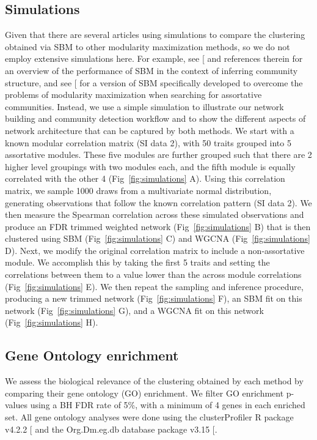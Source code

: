 \documentclass[
]{article}
\begin{document}
\subsection{Simulations}\label{simulations}

Given that there are several articles using simulations to compare the
clustering obtained via SBM to other modularity maximization methods, so
we do not employ extensive simulations here. For example, see
{[}\citeproc{ref-Peixoto2023-xd}{18}{]} and references therein for an
overview of the performance of SBM in the context of inferring community
structure, and see {[}\citeproc{ref-Zhang2020-up}{19}{]} for a version
of SBM specifically developed to overcome the problems of modularity
maximization when searching for assortative communities. Instead, we use
a simple simulation to illustrate our network building and community
detection workflow and to show the different aspects of network
architecture that can be captured by both methods. We start with a known
modular correlation matrix (SI data 2), with 50 traits grouped into 5
assortative modules. These five modules are further grouped such that
there are 2 higher level groupings with two modules each, and the fifth
module is equally correlated with the other 4 (Fig~\ref{fig:simulations}
A). Using this correlation matrix, we sample 1000 draws from a
multivariate normal distribution, generating observations that follow
the known correlation pattern (SI data 2). We then measure the Spearman
correlation across these simulated observations and produce an FDR
trimmed weighted network (Fig~\ref{fig:simulations} B) that is then
clustered using SBM (Fig~\ref{fig:simulations} C) and WGCNA
(Fig~\ref{fig:simulations} D). Next, we modify the original correlation
matrix to include a non-assortative module. We accomplish this by taking
the first 5 traits and setting the correlations between them to a value
lower than the across module correlations (Fig~\ref{fig:simulations} E).
We then repeat the sampling and inference procedure, producing a new
trimmed network (Fig~\ref{fig:simulations} F), an SBM fit on this
network (Fig~\ref{fig:simulations} G), and a WGCNA fit on this network
(Fig~\ref{fig:simulations} H).

\subsection{Gene Ontology enrichment}\label{gene-ontology-enrichment}

We assess the biological relevance of the clustering obtained by each
method by comparing their gene ontology (GO) enrichment. We filter GO
enrichment p-values using a BH FDR rate of 5\%, with a minimum of 4
genes in each enriched set. All gene ontology analyses were done using
the clusterProfiler R package v4.2.2 {[}\citeproc{ref-Wu2021-db}{30}{]}
and the Org.Dm.eg.db database package v3.15
{[}\citeproc{ref-godb}{31}{]}.
\end{document}
